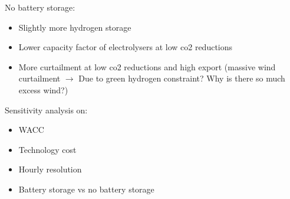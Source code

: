 No battery storage:
\begin{itemize}
    \item Slightly more hydrogen storage
    \item Lower capacity factor of electrolysers at low co2 reductions
    \item More curtailment at low co2 reductions and high export (massive wind curtailment $\rightarrow$ Due to green hydrogen constraint? Why is there so much excess wind?)
\end{itemize}

Sensitivity analysis on:
\begin{itemize}
    \item WACC
    \item Technology cost
    \item Hourly resolution
    \item Battery storage vs no battery storage
\end{itemize}


